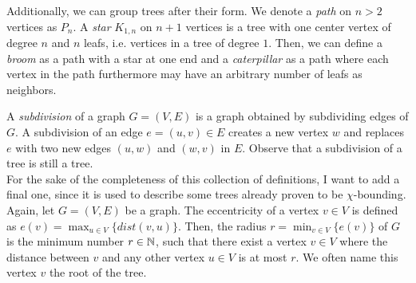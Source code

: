 Additionally, we can group trees after their form. We denote a \textit{path} on $n>2$ vertices as $P_n$. A \textit{star} $K_{1,n}$ on $n+1$ vertices is a tree with one center vertex of degree $n$ and $n$ leafs, i.e. vertices in a tree of degree $1$. Then, we can define a \textit{broom} as a path with a star at one end and a \textit{caterpillar} as a path where each vertex in the path furthermore may have an arbitrary number of leafs as neighbors.

A \textit{subdivision} of a graph $G=(V,E)$ is a graph obtained by subdividing edges of $G$. A subdivision of an edge $e=(u,v)\in E$ creates a new vertex $w$ and replaces $e$ with two new edges $(u,w)$ and $(w,v)$ in $E$. Observe that a subdivision of a tree is still a tree.\\

For the sake of the completeness of this collection of definitions, I want to add a final one, since it is used to describe some trees already proven to be $\chi$-bounding. Again, let $G=(V,E)$ be a graph. The eccentricity of a vertex $v\in V$ is defined as $\displaystyle e(v)=\max_{u \in V}\lbrace dist(v,u)\rbrace$. Then, the radius $\displaystyle r= \min_{v\in V}\lbrace e(v)\rbrace$ of $G$ is the minimum number $r\in\mathbb{N}$, such that there exist a vertex $v\in V$ where the distance between $v$ and any other vertex $u\in V$ is at most $r$. We often name this vertex $v$ the root of the tree.